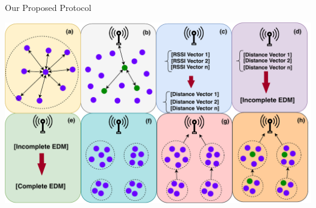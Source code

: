 \documentclass{beamer}
\begin{document}
\begin{frame}[t]{Our Proposed Protocol} %
\begin{center}
\includegraphics[scale=0.5]{figure/Steps.pdf}
\end{center}
\end{frame}
\end{document}
